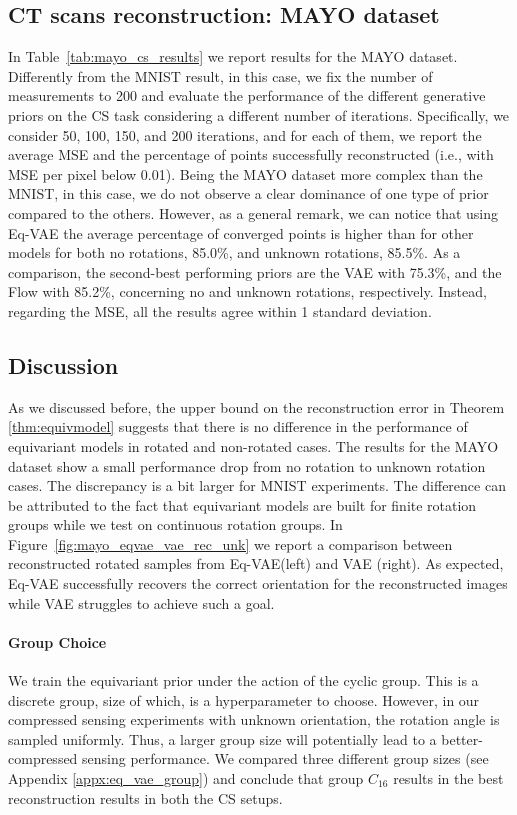 \subsection{CT scans reconstruction: MAYO dataset}
In Table~\ref{tab:mayo_cs_results} we report results for the MAYO dataset. Differently from the MNIST result, in this case, we fix the number of measurements to 200 and evaluate the performance of the different generative priors on the CS task considering a different number of iterations. Specifically, we consider 50, 100, 150, and 200 iterations, and for each of them, we report the average MSE and the percentage of points successfully reconstructed (i.e., with MSE per pixel below 0.01). 
Being the MAYO dataset more complex than the MNIST, in this case, we do not observe a clear dominance of one type of prior compared to the others. However, as a general remark, we can notice that using Eq-VAE the average percentage of converged points is higher than for other models for both no rotations, 85.0\%, and unknown rotations, 85.5\%. As a comparison, the second-best performing priors are the VAE with 75.3\%, and the Flow with 85.2\%, concerning no and unknown rotations, respectively. 
Instead, regarding the MSE, all the results agree within 1 standard deviation.



\subsection{Discussion}
As we discussed before, the upper bound on the reconstruction error in Theorem \ref{thm:equivmodel} suggests that there is no difference in the performance of equivariant models in rotated and non-rotated cases. The results for the MAYO dataset show a small performance drop from no rotation to unknown rotation cases. The discrepancy is a bit larger for MNIST experiments. 
The difference can be attributed to the fact that equivariant models are built for finite rotation groups while we test on continuous rotation groups. 
In Figure~\ref{fig:mayo_eqvae_vae_rec_unk} we report a comparison between reconstructed rotated samples from Eq-VAE(left) and VAE (right). As expected, Eq-VAE successfully recovers the correct orientation for the reconstructed images while VAE struggles to achieve such a goal. 

\paragraph{Group Choice} 
We train the equivariant prior under the action of the cyclic group. This is a discrete group, size of which, is a hyperparameter to choose. However, in our compressed sensing experiments with unknown orientation, the rotation angle is sampled uniformly. Thus, a larger group size will potentially lead to a better-compressed sensing performance. We compared three different group sizes (see Appendix \ref{appx:eq_vae_group}) and conclude that group $C_{16}$ results in the best reconstruction results in both the CS setups.
